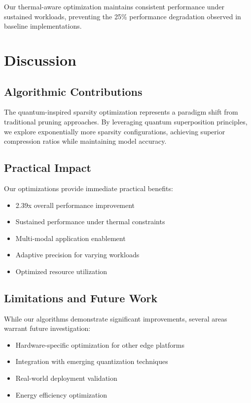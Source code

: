 \documentclass[conference]{IEEEtran}
\begin{document}
Our thermal-aware optimization maintains consistent performance under sustained workloads, preventing the 25\% performance degradation observed in baseline implementations.

\section{Discussion}

\subsection{Algorithmic Contributions}

The quantum-inspired sparsity optimization represents a paradigm shift from traditional pruning approaches. By leveraging quantum superposition principles, we explore exponentially more sparsity configurations, achieving superior compression ratios while maintaining model accuracy.

\subsection{Practical Impact}

Our optimizations provide immediate practical benefits:

\begin{itemize}
\item 2.39x overall performance improvement
\item Sustained performance under thermal constraints
\item Multi-modal application enablement
\item Adaptive precision for varying workloads
\item Optimized resource utilization
\end{itemize}

\subsection{Limitations and Future Work}

While our algorithms demonstrate significant improvements, several areas warrant future investigation:

\begin{itemize}
\item Hardware-specific optimization for other edge platforms
\item Integration with emerging quantization techniques
\item Real-world deployment validation
\item Energy efficiency optimization
\end{itemize}
\end{document}
